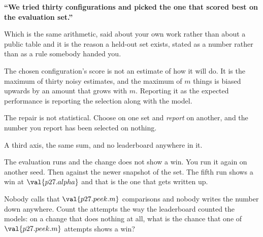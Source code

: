 \begin{fr}
\begin{trapbox}
\textbf{\enquote{We tried thirty configurations and picked the one that
scored best on the evaluation set.}}

Which is the same arithmetic, said about your own work rather than about a
public table \dash{} and it is the reason a held-out set exists, stated as a
number rather than as a rule somebody handed you.

The chosen configuration's score is not an estimate of how it will do. It is
the maximum of thirty noisy estimates, and the maximum of $m$ things is
biased upwards by an amount that grows with $m$. Reporting it as the expected
performance is reporting the selection along with the model.

The repair is not statistical. Choose on one set and \emph{report} on
another, and the number you report has been selected on nothing.
\end{trapbox}
\end{fr}

\begin{fr}
A third axis, the same sum, and no leaderboard anywhere in it.

The evaluation runs and the change does not show a win. You run it again on
another seed. Then against the newer snapshot of the set. The fifth run shows
a win at $\val{p27.alpha}$ and that is the one that gets written up.

Nobody calls that $\val{p27.peek.m}$ comparisons and nobody writes the number
down anywhere. Count the attempts the way the leaderboard counted the models:
on a change that does nothing at all, what is the chance that one of
$\val{p27.peek.m}$ attempts shows a win?
\dotline
\nextframe
\end{fr}

